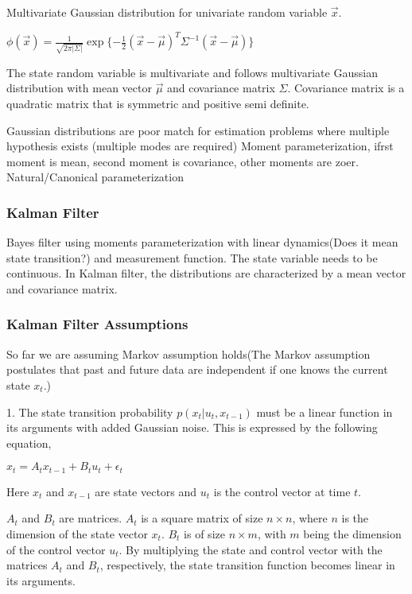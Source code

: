 \documentclass{article}
\begin{document}
Multivariate Gaussian distribution for univariate random variable $\vec{x}$.

$\phi(\vec{x}) = \frac{1}{\sqrt{2\pi |\Sigma|}}\exp\{-\frac{1}{2}(\vec{x} - \vec{\mu})^T\Sigma^{-1}(\vec{x} - \vec{\mu})\}$

The state random variable is multivariate and follows multivariate Gaussian distribution with mean vector $\vec{\mu}$ and covariance matrix $\Sigma$. Covariance matrix is a quadratic matrix that is symmetric and positive semi definite.

Gaussian distributions are poor match for estimation problems where multiple hypothesis exists (multiple modes are required)
Moment parameterization, ifrst moment is mean, second moment is covariance, other moments are zoer.
Natural/Canonical parameterization


\subsubsection{Kalman Filter}
Bayes filter using moments parameterization with linear dynamics(Does it mean state transition?) and measurement function. The state variable needs to be continuous. In Kalman filter, the distributions are characterized by a mean vector and covariance matrix.

\subsubsection{Kalman Filter Assumptions}

So far we are assuming Markov assumption holds(The Markov assumption postulates that past and future data are independent if one knows the current state $x_t$.)

1.
The state transition probability $p(x_t | u_t, x_{t-1})$ must be a linear function in its arguments with added Gaussian noise. This is expressed by the following equation,

$x_t = A_t x_{t-1} + B_t u_t + \epsilon_t$

Here $x_t$ and $x_{t-1}$ are state vectors and $u_t$ is the control vector at time $t$. 

$A_t$ and $B_t$ are matrices. $A_t$ is a square matrix of size $n \times n$, where $n$ is the dimension of the state vector $x_t$. $B_t$ is of size $n \times m$, with $m$ being the dimension of the control vector $u_t$. By multiplying the state and control vector with the matrices $A_t$ and $B_t$, respectively, the state transition function becomes linear in its arguments.
\end{document}
